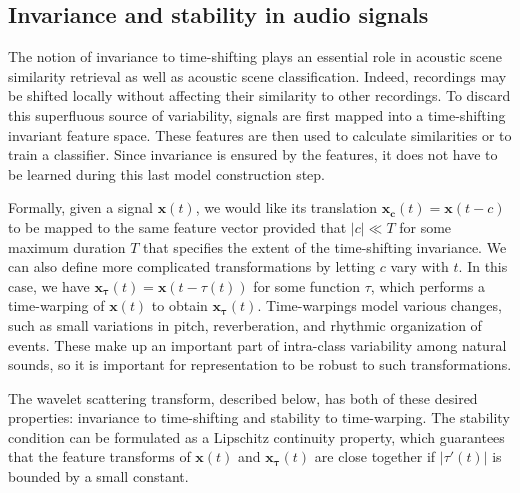 \documentclass[smallextended]{svjour3}
\begin{document}
\subsection{Invariance and stability in audio signals}
The notion of invariance to time-shifting plays an essential role in acoustic scene similarity retrieval as well as acoustic scene classification.
Indeed, recordings may be shifted locally without affecting their similarity to other recordings.
To discard this superfluous source of variability, signals are first mapped into a time-shifting invariant feature space. These features are then used to calculate similarities or to train a classifier. Since invariance is ensured by the features, it does not have to be learned during this last model construction step.

Formally, given a signal $\boldsymbol{x}(t)$, we would like its translation $\boldsymbol{x_c}(t) = \boldsymbol{x}(t-c)$ to be mapped to the same feature vector provided that $|c| \ll T$ for some maximum duration $T$ that specifies the extent of the time-shifting invariance. We can also define more complicated transformations by letting $c$ vary with $t$. In this case, we have $\boldsymbol{x_\tau}(t) = \boldsymbol{x}(t-\tau(t))$ for some function $\tau$, which performs a time-warping of $\boldsymbol{x}(t)$ to obtain $\boldsymbol{x_\tau}(t)$. Time-warpings model various changes, such as small variations in pitch, reverberation, and rhythmic organization of events. These make up an important part of intra-class variability among natural sounds, so it is important for representation to be robust to such transformations.

The wavelet scattering transform, described below, has both of these desired properties: invariance to time-shifting and stability to time-warping. The stability condition can be formulated as a Lipschitz continuity property, which guarantees that the feature transforms of $\boldsymbol{x}(t)$ and $\boldsymbol{x_\tau}(t)$ are close together if $|\tau'(t)|$ is bounded by a small constant.
\end{document}
